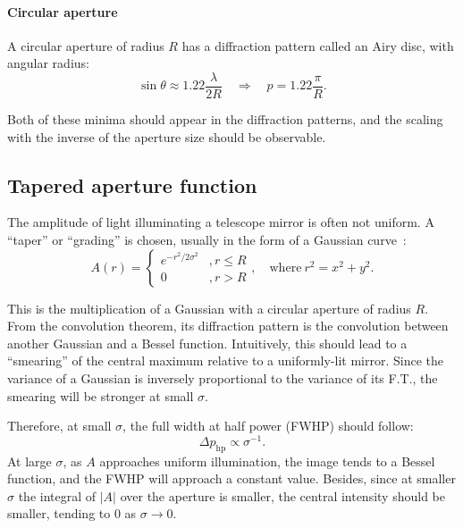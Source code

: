 \documentclass[11pt]{article}
\newcommand{\R}[1]{\mathrm{#1}}
\begin{document}
\paragraph{Circular aperture} A circular aperture of radius $R$ has a diffraction pattern called an Airy disc, with angular radius:
\begin{equation}\label{eqn:test_circ}
    \sin{\theta} \approx 1.22 \frac{\lambda}{2R} \quad \Rightarrow \quad p = 1.22 \frac{\pi}{R}.
\end{equation}

Both of these minima should appear in the diffraction patterns, and the scaling with the inverse of the aperture size should be observable.

\subsection{Tapered aperture function}\label{sec:analysis:taper}
The amplitude of light illuminating a telescope mirror is often not uniform. A ``taper'' or ``grading'' is chosen, usually in the form of a Gaussian curve~\cite[Section~6.4]{RadioAstro}:
\begin{equation}
    A(r) = \begin{cases}
        e ^ {-r^2 / {2 \sigma^2}} &, r \leq R\\
        0 &, r > R
    \end{cases}, \quad \R{where}\ r^2 = x^2 + y^2.
\end{equation}

This is the multiplication of a Gaussian with a circular aperture of radius $R$. From the convolution theorem, its diffraction pattern is the convolution between another Gaussian and a Bessel function. Intuitively, this should lead to a ``smearing'' of the central maximum relative to a uniformly-lit mirror. Since the variance of a Gaussian is inversely proportional to the variance of its F.T., the smearing will be stronger at small $\sigma$.

Therefore, at small $\sigma$, the full width at half power (FWHP) should follow:
\begin{equation}
    \Delta p_{\R{hp}} \propto \sigma^{-1}.
\end{equation}
At large $\sigma$, as $A$ approaches uniform illumination, the image tends to a Bessel function, and the FWHP will approach a constant value. Besides, since at smaller $\sigma$ the integral of $|A|$ over the aperture is smaller, the central intensity should be smaller, tending to 0 as $\sigma \rightarrow 0$.
\end{document}
